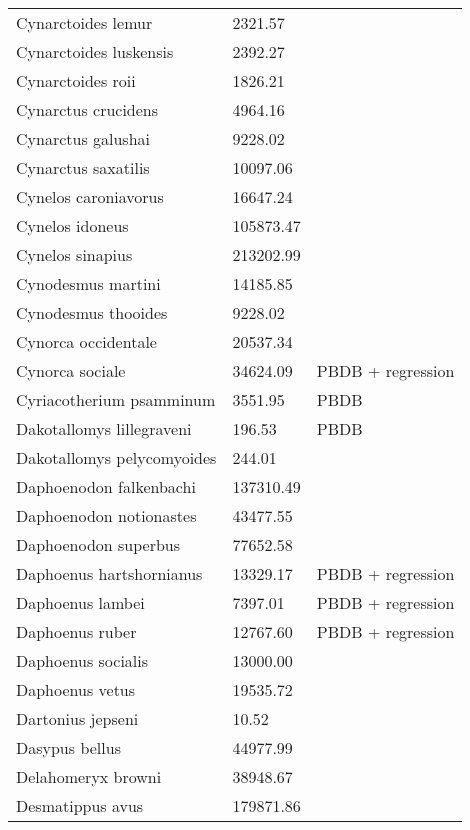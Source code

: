 \documentclass{article}
\begin{document}
\begin{center}
\begin{longtable}{p{} p{} p{} }
  Cynarctoides lemur & 2321.57 & \cite{Tomiya2013} \\ 
  Cynarctoides luskensis & 2392.27 & \cite{Tomiya2013} \\ 
  Cynarctoides roii & 1826.21 & \cite{Tomiya2013} \\ 
  Cynarctus crucidens & 4964.16 & \cite{Tomiya2013} \\ 
  Cynarctus galushai & 9228.02 & \cite{Tomiya2013} \\ 
  Cynarctus saxatilis & 10097.06 & \cite{Tomiya2013} \\ 
  Cynelos caroniavorus & 16647.24 & \cite{Tomiya2013} \\ 
  Cynelos idoneus & 105873.47 & \cite{Tomiya2013} \\ 
  Cynelos sinapius & 213202.99 & \cite{Tomiya2013} \\ 
  Cynodesmus martini & 14185.85 & \cite{Tomiya2013} \\ 
  Cynodesmus thooides & 9228.02 & \cite{Tomiya2013} \\ 
  Cynorca occidentale & 20537.34 & \cite{Tomiya2013} \\ 
  Cynorca sociale & 34624.09 & PBDB + regression \\ 
  Cyriacotherium psamminum & 3551.95 & PBDB \\ 
  Dakotallomys lillegraveni & 196.53 & PBDB \\ 
  Dakotallomys pelycomyoides & 244.01 & \cite{Mihlbachler2006} \\ 
  Daphoenodon falkenbachi & 137310.49 & \cite{Tomiya2013} \\ 
  Daphoenodon notionastes & 43477.55 & \cite{Tomiya2013} \\ 
  Daphoenodon superbus & 77652.58 & \cite{Tomiya2013} \\ 
  Daphoenus hartshornianus & 13329.17 & PBDB + regression \\ 
  Daphoenus lambei & 7397.01 & PBDB + regression \\ 
  Daphoenus ruber & 12767.60 & PBDB + regression \\ 
  Daphoenus socialis & 13000.00 & \cite{McKenna2011} \\ 
  Daphoenus vetus & 19535.72 & \cite{Tomiya2013} \\ 
  Dartonius jepseni & 10.52 & \cite{Hay1969} \\ 
  Dasypus bellus & 44977.99 & \cite{Smith2004} \\ 
  Delahomeryx browni & 38948.67 & \cite{Tomiya2013} \\ 
  Desmatippus avus & 179871.86 & \cite{Tomiya2013} \\ 

\end{longtable}
\end{center}
\end{document}
